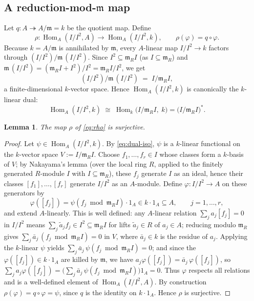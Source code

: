 \documentclass{amsart}
\newtheorem{lemma}{Lemma}
\begin{document}
\subsection{A reduction-mod-$\mathfrak m$ map}
Let $q\colon A\twoheadrightarrow A/\mathfrak m=k$ be the quotient map. Define
\begin{equation}\label{eq:rho}
\rho\colon \operatorname{Hom}_A(I/I^2,A)\longrightarrow
\operatorname{Hom}_A(I/I^2,k),\qquad \rho(\varphi)=q\circ\varphi .
\end{equation}
Because $k=A/\mathfrak m$ is annihilated by $\mathfrak m$, every $A$-linear map
$I/I^2\to k$ factors through
$(I/I^2)\big/\mathfrak m\,(I/I^2)$. Since $I^2\subseteq \mathfrak m_R I$ (as
$I\subseteq\mathfrak m_R$) and $\mathfrak m\,(I/I^2)=(\mathfrak m_R I+I^2)/I^2
=\mathfrak m_R I/I^2$, we get
\[
(I/I^2)\big/\mathfrak m\,(I/I^2)\;=\;I/\mathfrak m_R I ,
\]
a finite-dimensional $k$-vector space. Hence $\operatorname{Hom}_A(I/I^2,k)$ is
canonically the $k$-linear dual:
\begin{equation}\label{eq:dual-iso}
\operatorname{Hom}_A(I/I^2,k)\;\cong\;\operatorname{Hom}_k\!\bigl(I/\mathfrak m_R I,\;k\bigr)
=\bigl(I/\mathfrak m_R I\bigr)^{*}.
\end{equation}

\begin{lemma}\label{lem:rho-surj}
The map $\rho$ of \eqref{eq:rho} is surjective.
\end{lemma}

\begin{proof}
Let $\psi\in\operatorname{Hom}_A(I/I^2,k)$. By \eqref{eq:dual-iso}, $\psi$ is a
$k$-linear functional on the $k$-vector space $V:=I/\mathfrak m_R I$. Choose
$f_1,\dots,f_r\in I$ whose classes form a $k$-basis of $V$; by Nakayama's lemma
(over the local ring $R$, applied to the finitely generated $R$-module $I$ with
$I\subseteq\mathfrak m_R$), these $f_j$ generate $I$ as an ideal, hence their
classes $[f_1],\dots,[f_r]$ generate $I/I^2$ as an $A$-module. Define
$\varphi\colon I/I^2\to A$ on these generators by
\[
\varphi([f_j])=\psi(f_j\bmod\mathfrak m_R I)\cdot 1_A\in k\cdot 1_A\subseteq A,
\qquad j=1,\dots,r,
\]
and extend $A$-linearly. This is well defined: any $A$-linear relation
$\sum_j a_j[f_j]=0$ in $I/I^2$ means $\sum_j \tilde a_j f_j\in I^2\subseteq
\mathfrak m_R I$ for lifts $\tilde a_j\in R$ of $a_j\in A$; reducing modulo
$\mathfrak m_R$ gives $\sum_j \bar a_j\,(f_j\bmod\mathfrak m_R I)=0$ in $V$, where
$\bar a_j\in k$ is the residue of $a_j$. Applying the $k$-linear $\psi$ yields
$\sum_j \bar a_j\,\psi(f_j\bmod\mathfrak m_R I)=0$; and since the
$\varphi([f_j])\in k\cdot1_A$ are killed by $\mathfrak m$, we have
$a_j\varphi([f_j])=\bar a_j\,\varphi([f_j])$, so
$\sum_j a_j\varphi([f_j])=\bigl(\sum_j \bar a_j\,\psi(f_j\bmod\mathfrak m_R I)\bigr)1_A=0$.
Thus $\varphi$ respects all relations and is a well-defined element of
$\operatorname{Hom}_A(I/I^2,A)$. By construction $\rho(\varphi)=q\circ\varphi=\psi$,
since $q$ is the identity on $k\cdot1_A$. Hence $\rho$ is surjective.
\end{proof}
\end{document}
